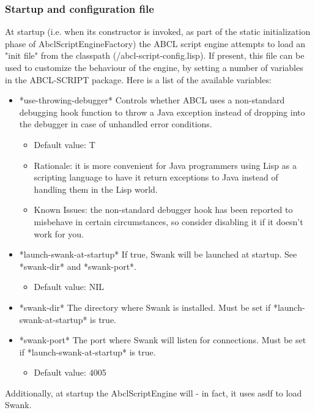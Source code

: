 \documentclass[10pt]{book}
\begin{document}
\subsubsection{Startup and configuration file}

At startup (i.e. when its constructor is invoked, as part of the
static initialization phase of AbclScriptEngineFactory) the ABCL
script engine attempts to load an "init file" from the classpath
(/abcl-script-config.lisp). If present, this file can be used to
customize the behaviour of the engine, by setting a number of
variables in the ABCL-SCRIPT package. Here is a list of the available
variables:

\begin{itemize}
\item *use-throwing-debugger* Controls whether ABCL uses a
  non-standard debugging hook function to throw a Java exception
  instead of dropping into the debugger in case of unhandled error
  conditions.
  \begin{itemize}
  \item Default value: T
  \item Rationale: it is more convenient for Java programmers using
    Lisp as a scripting language to have it return exceptions to Java
    instead of handling them in the Lisp world.
  \item Known Issues: the non-standard debugger hook has been reported
    to misbehave in certain circumstances, so consider disabling it if
    it doesn't work for you.
  \end{itemize}
\item *launch-swank-at-startup* If true, Swank will be launched at
  startup. See *swank-dir* and *swank-port*.
  \begin{itemize}
  \item Default value: NIL
  \end{itemize}
\item *swank-dir* The directory where Swank is installed. Must be set
  if *launch-swank-at-startup* is true.
\item *swank-port* The port where Swank will listen for
  connections. Must be set if *launch-swank-at-startup* is true.
  \begin{itemize}
  \item Default value: 4005
  \end{itemize}
\end{itemize}

Additionally, at startup the AbclScriptEngine will  - in fact, it uses asdf to load Swank.
\end{document}
